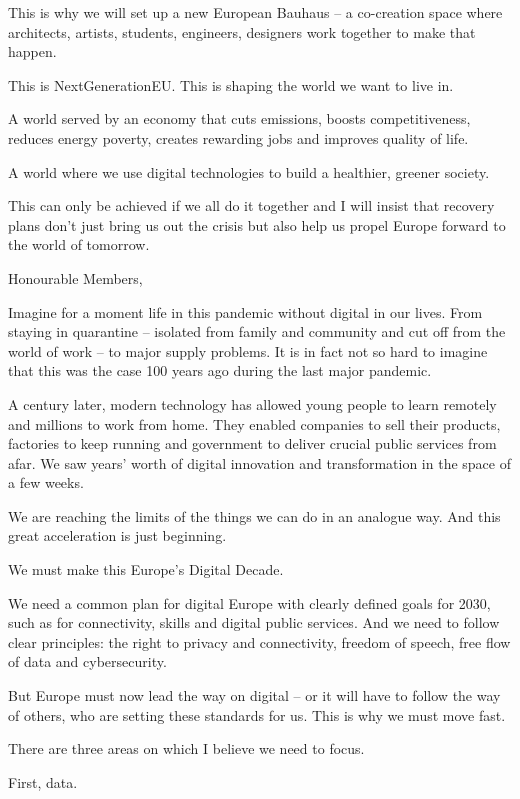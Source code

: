 \documentclass[a4paper,11pt]{article}
\begin{document}
This is why we will set up a new European Bauhaus – a co-creation space where architects, artists, students, engineers, designers work together to make that happen.

This is NextGenerationEU. This is shaping the world we want to live in.

A world served by an economy that cuts emissions, boosts competitiveness, reduces energy poverty, creates rewarding jobs and improves quality of life.

A world where we use digital technologies to build a healthier, greener society.

This can only be achieved if we all do it together and I will insist that recovery plans don't just bring us out the crisis but also help us propel Europe forward to the world of tomorrow. 

 

Honourable Members,

Imagine for a moment life in this pandemic without digital in our lives. From staying in quarantine – isolated from family and community and cut off from the world of work – to major supply problems. It is in fact not so hard to imagine that this was the case 100 years ago during the last major pandemic.

A century later, modern technology has allowed young people to learn remotely and millions to work from home. They enabled companies to sell their products, factories to keep running and government to deliver crucial public services from afar.  We saw years' worth of digital innovation and transformation in the space of a few weeks.

We are reaching the limits of the things we can do in an analogue way. And this great acceleration is just beginning.

We must make this Europe's Digital Decade.

We need a common plan for digital Europe with clearly defined goals for 2030, such as for connectivity, skills and digital public services. And we need to follow clear principles: the right to privacy and connectivity, freedom of speech, free flow of data and cybersecurity.

But Europe must now lead the way on digital – or it will have to follow the way of others, who are setting these standards for us. This is why we must move fast.  

There are three areas on which I believe we need to focus.

First, data.
\end{document}
